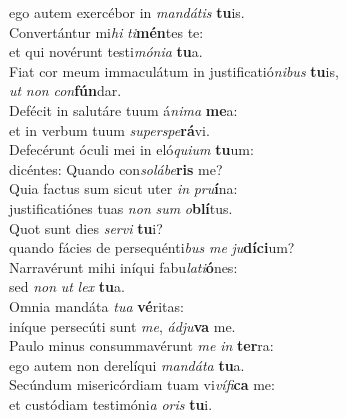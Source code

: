 \evenverse ego autem exercébor in \textit{man}\textit{dá}\textit{tis} \textbf{tu}is.\\
\oddverse Convertántur mi\textit{hi} \textit{ti}\textbf{mén}tes te:~\*\\
\oddverse et qui novérunt testi\textit{mó}\textit{ni}\textit{a} \textbf{tu}a.\\
\evenverse Fiat cor meum immaculátum in justificatió\textit{ni}\textit{bus} \textbf{tu}is,~\*\\
\evenverse \textit{ut} \textit{non} \textit{con}\textbf{fún}dar.\\
\oddverse Defécit in salutáre tuum á\textit{ni}\textit{ma} \textbf{me}a:~\*\\
\oddverse et in verbum tuum \textit{su}\textit{per}\textit{spe}\textbf{rá}vi.\\
\evenverse Defecérunt óculi mei in eló\textit{qui}\textit{um} \textbf{tu}um:~\*\\
\evenverse dicéntes: Quando con\textit{so}\textit{lá}\textit{be}\textbf{ris} me?\\
\oddverse Quia factus sum sicut uter \textit{in} \textit{pru}\textbf{í}na:~\*\\
\oddverse justificatiónes tuas \textit{non} \textit{sum} \textit{o}\textbf{blí}tus.\\
\evenverse Quot sunt dies \textit{ser}\textit{vi} \textbf{tu}i?~\*\\
\evenverse quando fácies de persequénti\textit{bus} \textit{me} \textit{ju}\textbf{dí}\textbf{ci}um?\\
\oddverse Narravérunt mihi iníqui fabu\textit{la}\textit{ti}\textbf{ó}nes:~\*\\
\oddverse sed \textit{non} \textit{ut} \textit{lex} \textbf{tu}a.\\
\evenverse Omnia mandáta \textit{tu}\textit{a} \textbf{vé}ritas:~\*\\
\evenverse iníque persecúti sunt \textit{me}, \textit{ád}\textit{ju}\textbf{va} me.\\
\oddverse Paulo minus consummavérunt \textit{me} \textit{in} \textbf{ter}ra:~\*\\
\oddverse ego autem non derelíqui \textit{man}\textit{dá}\textit{ta} \textbf{tu}a.\\
\evenverse Secúndum misericórdiam tuam vi\textit{ví}\textit{fi}\textbf{ca} me:~\*\\
\evenverse et custódiam testimóni\textit{a} \textit{o}\textit{ris} \textbf{tu}i.\\
